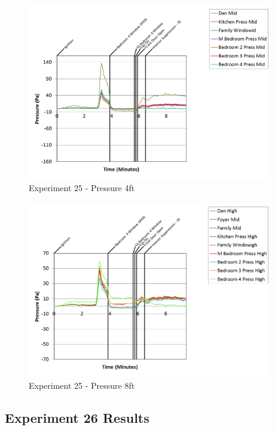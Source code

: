 \documentclass{article}
\begin{document}
\begin{appendices}
\begin{figure}[h!]
	\centering
	\includegraphics[height=3.05in]{0_Images/Results_Charts/Exp_25_Charts/Pressure4ft.png}
	\caption{Experiment 25 - Pressure 4ft}
\end{figure}

\clearpage

\begin{figure}[h!]
	\centering
	\includegraphics[height=3.05in]{0_Images/Results_Charts/Exp_25_Charts/Pressure8ft.png}
	\caption{Experiment 25 - Pressure 8ft}
\end{figure}


\clearpage
\clearpage		\large
\subsection{Experiment 26 Results} \label{App:Exp26Results} 


\end{appendices}
\end{document}
